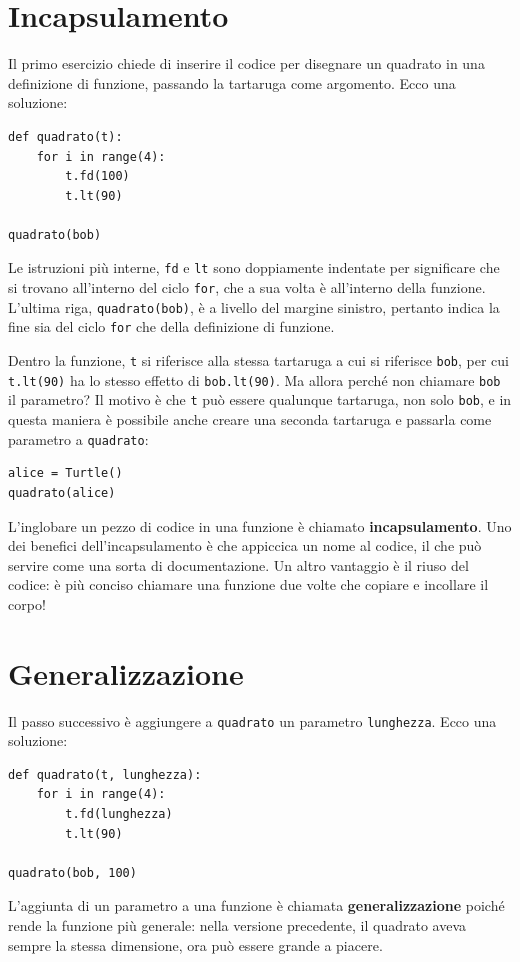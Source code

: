 \documentclass[10pt]{book}
\begin{document}
\section{Incapsulamento}

Il primo esercizio chiede di inserire il codice per disegnare un quadrato in una definizione di funzione, passando la tartaruga come argomento. Ecco una soluzione:

\begin{verbatim}
def quadrato(t):
    for i in range(4):
        t.fd(100)
        t.lt(90)

quadrato(bob)
\end{verbatim}
%
Le istruzioni più interne, {\tt fd} e {\tt lt} sono doppiamente indentate per significare che si trovano all'interno del ciclo {\tt for}, che a sua volta è all'interno della funzione. L'ultima riga, {\tt quadrato(bob)}, è a livello del margine sinistro, pertanto indica la fine sia del ciclo {\tt for} che della definizione di funzione.

Dentro la funzione, {\tt t} si riferisce alla stessa tartaruga a cui si riferisce {\tt bob}, per cui {\tt t.lt(90)} ha lo stesso effetto di {\tt bob.lt(90)}.
Ma allora perché non chiamare {\tt bob} il parametro? Il motivo è che {\tt t}
può essere qualunque tartaruga, non solo {\tt bob}, e in questa maniera è possibile anche creare una seconda tartaruga e passarla come parametro a {\tt quadrato}:

\begin{verbatim}
alice = Turtle()
quadrato(alice)
\end{verbatim}
%
L'inglobare un pezzo di codice in una funzione è chiamato {\bf incapsulamento}. Uno dei benefici dell'incapsulamento è che appiccica un nome al codice, il che può servire come una sorta di documentazione. Un altro vantaggio è il riuso del codice: è più conciso chiamare una funzione due volte che copiare e incollare il corpo!


\section{Generalizzazione}

Il passo successivo è aggiungere a {\tt quadrato} un parametro {\tt lunghezza}.
Ecco una soluzione:

\begin{verbatim}
def quadrato(t, lunghezza):
    for i in range(4):
        t.fd(lunghezza)
        t.lt(90)

quadrato(bob, 100)
\end{verbatim}
%
L'aggiunta di un parametro a una funzione è chiamata {\bf generalizzazione}
poiché rende la funzione più generale: nella versione precedente, il quadrato aveva sempre la stessa dimensione, ora può essere grande a piacere.
\end{document}
